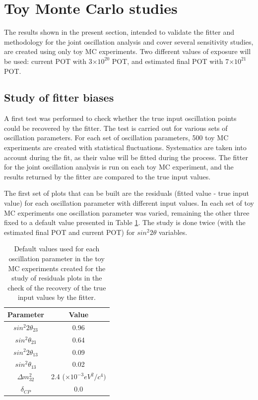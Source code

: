 
\section {Toy Monte Carlo studies}
\label{sec:validation}

The results shown in the present section, intended to validate the fitter and methodology for the joint oscillation analysis and cover several sensitivity studies, are created using only toy MC experiments. Two different values of exposure will be used: current POT with 3$\times 10^{20} $ POT, and estimated final POT with 7$\times 10^{21}$ POT. 

\subsection{Study of fitter biases}

A first test was performed to check whether the true input oscillation points could be recovered by the fitter. The test is carried out for various sets of oscillation parameters. For each set of oscillation parameters, 500 toy MC experiments are created with statistical fluctuations. Systematics are taken into account during the fit, as their value will be fitted during the process. The fitter for the joint oscillation analysis is run on each toy MC experiment, and the results returned by the fitter are compared to the true input values. 

The first set of plots that can be built are the residuals (fitted value - true input value) for each oscillation parameter with different input values. In each set of toy MC experiments one oscillation parameter was varied, remaining the other three fixed to a default value presented in Table \ref{tab:defaultvaluesresiduals}. The study is done twice (with the estimated final POT and current POT) for $sin^{2}2\theta$ variables. 

\begin{table}[h]
\centering
\begin{tabular}{|c|c|}
\hline
Parameter & Value \\
\hline \hline
$sin^{2}2\theta_{23} $ &  0.96 \\
$sin^{2}\theta_{23} $ & 0.64\\
$sin^{2}2\theta_{13} $ &  0.09 \\
$sin^{2}\theta_{13} $ & 0.02\\
$\Delta m_{32}^{2}$ & 2.4 ($\times10^{-3} eV^{2}/c^{4})$ \\
$\delta_{CP}$ & 0.0 \\
\hline
\end{tabular}
\caption{Default values used for each oscillation parameter in the toy MC experiments created for the study of residuals plots in the check of the recovery of the true input values by the fitter.}
\label{tab:defaultvaluesresiduals}
\end{table}

